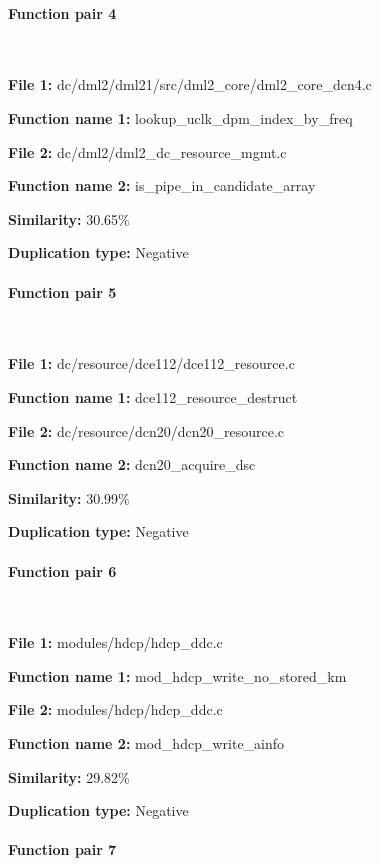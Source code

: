 \paragraph{Function pair 4 }  

\

\textbf{File 1:} dc/dml2/dml21/src/dml2\_core/dml2\_core\_dcn4.c

\textbf{Function name 1:} lookup\_uclk\_dpm\_index\_by\_freq

\textbf{File 2:} dc/dml2/dml2\_dc\_resource\_mgmt.c

\textbf{Function name 2:} is\_pipe\_in\_candidate\_array

\textbf{Similarity:} 30.65\%

\textbf{Duplication type:} Negative


\paragraph{Function pair 5 }  

\

\textbf{File 1:} dc/resource/dce112/dce112\_resource.c

\textbf{Function name 1:} dce112\_resource\_destruct

\textbf{File 2:} dc/resource/dcn20/dcn20\_resource.c

\textbf{Function name 2:} dcn20\_acquire\_dsc

\textbf{Similarity:} 30.99\%

\textbf{Duplication type:} Negative


\paragraph{Function pair 6 }  

\

\textbf{File 1:} modules/hdcp/hdcp\_ddc.c

\textbf{Function name 1:} mod\_hdcp\_write\_no\_stored\_km

\textbf{File 2:} modules/hdcp/hdcp\_ddc.c

\textbf{Function name 2:} mod\_hdcp\_write\_ainfo

\textbf{Similarity:} 29.82\%

\textbf{Duplication type:} Negative


\paragraph{Function pair 7 }  

